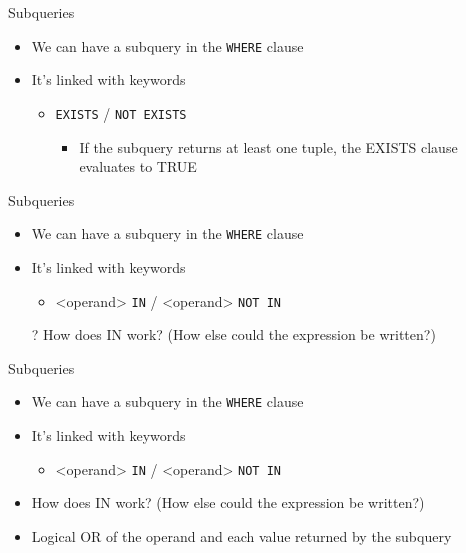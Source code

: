 \documentclass[aspectratio=169]{beamer}
\begin{document}
\begin{frame}{Subqueries}

\begin{itemize}
\item We can have a subquery in the \texttt{WHERE} clause
\item It's linked with keywords
	\begin{itemize}
	\item \texttt{EXISTS} /  \texttt{NOT EXISTS} 
	\begin{itemize}
	\item If the subquery returns at least one tuple, the EXISTS clause evaluates to TRUE
	\end{itemize}
	\end{itemize}
	
\end{itemize}
\end{frame}
\begin{frame}{Subqueries}

\begin{itemize}
\item We can have a subquery in the \texttt{WHERE} clause
\item It's linked with keywords
	\begin{itemize}
	\item {<operand>} \texttt{IN} / <operand> \texttt{NOT IN}
	\end{itemize}
	
\item[?] How does IN work? (How else could the expression be written?)
\end{itemize}
\end{frame}
\begin{frame}{Subqueries}

\begin{itemize}
\item We can have a subquery in the \texttt{WHERE} clause
\item It's linked with keywords
	\begin{itemize}
	\item {<operand>} \texttt{IN} / <operand> \texttt{NOT IN}
	\end{itemize}
	
\item How does IN work? (How else could the expression be written?)
\item Logical OR of the operand and each value returned by the subquery
\end{itemize}
\end{frame}
\end{document}
